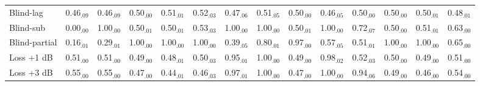 \begin{tabular}{lccccccccccccc}
Blind-lag & 0.46$_{.09}$ & 0.46$_{.09}$ & 0.50$_{.00}$ & 0.51$_{.01}$ & 0.52$_{.03}$ & 0.47$_{.06}$ & 0.51$_{.05}$ & 0.50$_{.00}$ & 0.46$_{.05}$ & 0.50$_{.00}$ & 0.50$_{.00}$ & 0.50$_{.01}$ & 0.48$_{.01}$\\
Blind-sub & 0.00$_{.00}$ & 1.00$_{.00}$ & 0.50$_{.01}$ & 0.50$_{.01}$ & 0.53$_{.03}$ & 1.00$_{.00}$ & 1.00$_{.00}$ & 0.50$_{.01}$ & 1.00$_{.00}$ & 0.72$_{.07}$ & 0.50$_{.00}$ & 0.51$_{.01}$ & 0.63$_{.00}$\\
Blind-partial & 0.16$_{.01}$ & 0.29$_{.01}$ & 1.00$_{.00}$ & 1.00$_{.00}$ & 1.00$_{.00}$ & 0.39$_{.05}$ & 0.80$_{.01}$ & 0.97$_{.00}$ & 0.57$_{.05}$ & 0.51$_{.01}$ & 1.00$_{.00}$ & 1.00$_{.00}$ & 0.65$_{.00}$\\
Loss +1 dB & 0.51$_{.00}$ & 0.51$_{.00}$ & 0.49$_{.00}$ & 0.48$_{.01}$ & 0.50$_{.03}$ & 0.95$_{.01}$ & 1.00$_{.00}$ & 0.49$_{.00}$ & 0.98$_{.02}$ & 0.52$_{.03}$ & 0.50$_{.00}$ & 0.49$_{.00}$ & 0.51$_{.00}$\\
Loss +3 dB & 0.55$_{.00}$ & 0.55$_{.00}$ & 0.47$_{.00}$ & 0.44$_{.01}$ & 0.46$_{.03}$ & 0.97$_{.01}$ & 1.00$_{.00}$ & 0.47$_{.00}$ & 1.00$_{.00}$ & 0.94$_{.06}$ & 0.49$_{.00}$ & 0.46$_{.00}$ & 0.54$_{.00}$\\
\hline
\end{tabular}